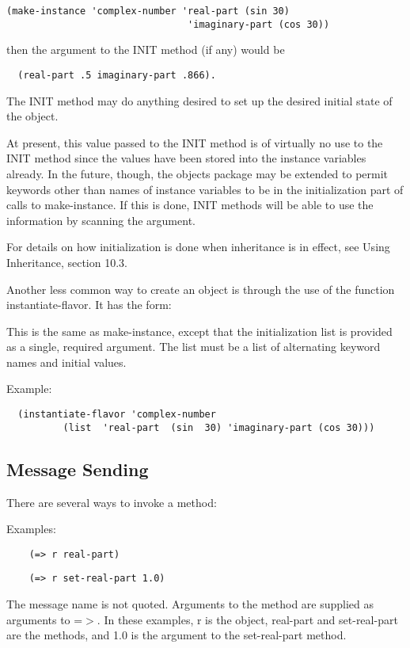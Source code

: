 \begin{verbatim}
(make-instance 'complex-number 'real-part (sin 30)
                                'imaginary-part (cos 30))
\end{verbatim}
then the argument to the INIT method (if any) would be

\begin{verbatim}
  (real-part .5 imaginary-part .866).
\end{verbatim}
  The  INIT method may do anything desired to set up the desired
initial state of the object.

  At present, this  value  passed  to  the  INIT  method  is  of
virtually  no  use to the INIT method since the values have been
stored into the instance variables  already.    In  the  future,
though,  the  objects package may be extended to permit keywords
other  than  names  of  instance  variables   to   be   in   the
initialization part of calls to make-instance.  If this is done,
INIT methods will be able to use the information by scanning the
argument.

  For  details on how initialization is done when inheritance is
in effect, see Using Inheritance, section 10.3.

  Another less common way to create an object is through the use
of the function instantiate-flavor.  It has the form:

{   
    This  is  the  same  as  make-instance,  except   that   the
    initialization  list  is  provided  as  a  single,  required
    argument. The list must be a  list  of  alternating  keyword
    names and initial values.
}

    Example:

\begin{verbatim}
  (instantiate-flavor 'complex-number
          (list  'real-part  (sin  30) 'imaginary-part (cos 30)))
\end{verbatim}

\subsection{Message Sending}

  There are several ways to invoke a method:

{}
    Examples:

\begin{verbatim}
    (=> r real-part)
\end{verbatim}
\begin{verbatim}
    (=> r set-real-part 1.0)
\end{verbatim}
    The message name is not quoted. Arguments to the method are
    supplied as arguments to =$>$. In these examples, r is the
    object, real-part and set-real-part are the methods, and 1.0
    is the argument to the set-real-part method.

